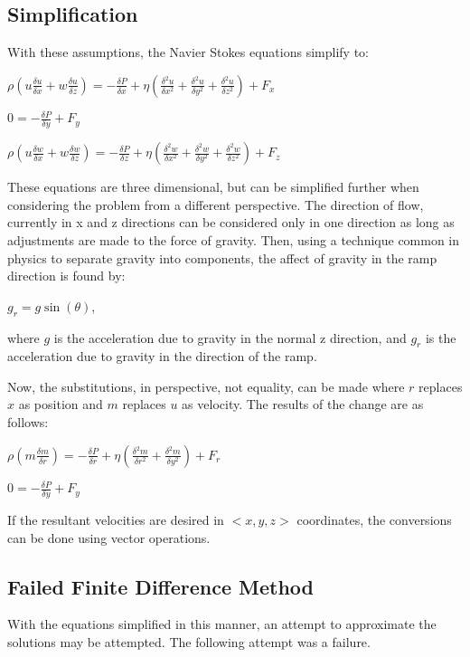 \documentclass{article}
\begin{document}
\subsection{Simplification}
	With these assumptions, the Navier Stokes equations simplify to:
	\begin{center}
		$\rho (u\frac{\delta u}{\delta x}+w\frac{\delta u}{\delta z})=-\frac{\delta P}{\delta x}+\eta(\frac{\delta^{2} u}{\delta x^2}+\frac{\delta^{2} u}{\delta y^2}+\frac{\delta^{2} u}{\delta z^2})+F_x$
		
		$0=-\frac{\delta P}{\delta y}+F_y$
		
		$\rho (u\frac{\delta w}{\delta x}+w\frac{\delta w}{\delta z})=-\frac{\delta P}{\delta z}+\eta(\frac{\delta^{2} w}{\delta x^2}+\frac{\delta^{2} w}{\delta y^2}+\frac{\delta^{2} w}{\delta z^2})+F_z$
	\end{center}
These equations are three dimensional, but can be simplified further when considering the problem from a different perspective. The direction of flow, currently in x and z directions can be considered only in one direction as long as adjustments are made to the force of gravity. Then, using a technique common in physics to separate gravity into components, the affect of gravity in the ramp direction is found by:
\begin{center}
	$g_r=g\sin(\theta)$,
\end{center}
 where $g$ is the acceleration due to gravity in the normal z direction, and $g_r$ is the acceleration due to gravity in the direction of the ramp.

Now, the substitutions, in perspective, not equality, can be made where $r$ replaces $x$ as position and $m$ replaces $u$ as velocity. The results of the change are as follows:
\begin{center}
	$\rho(m\frac{\delta m}{\delta r})=-\frac{\delta P}{\delta r}+\eta(\frac{\delta^{2} m}{\delta r^2}+\frac{\delta^{2} m}{\delta y^2})+F_r$
	
	$0=-\frac{\delta P}{\delta y}+F_y$
\end{center}
If the resultant velocities are desired in $
<x,y,z>$ coordinates, the conversions can be done using vector operations.
	\subsection{Failed Finite Difference Method}
	With the equations simplified in this manner, an attempt to approximate the solutions may be attempted. The following attempt was a failure.
	
\end{document}
